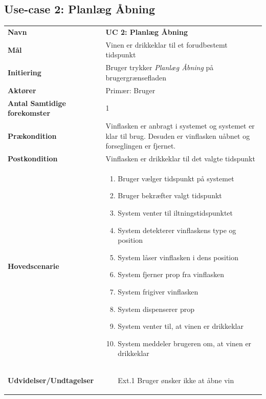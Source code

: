 \subsection{Use-case 2: Planlæg Åbning}
\begin{tabular}{>{\bfseries}p{100pt} p{300pt}}
	
	Navn & \bfseries{UC 2: Planlæg Åbning} \\
	Mål & Vinen er drikkeklar til et forudbestemt tidspunkt\\
	Initiering & Bruger trykker \emph{Planlæg Åbning} på brugergrænsefladen\\
	Aktører & Primær: Bruger \\
	Antal Samtidige forekomster & 1 \\
	Prækondition & Vinflasken er anbragt i systemet og systemet er klar til brug. Desuden er vinflasken uåbnet og forseglingen er fjernet. \\
	Postkondition & Vinflasken er drikkeklar til det valgte tidspunkt\\
	Hovedscenarie & \begin{enumerate}
		\item Bruger vælger tidspunkt på systemet
		\subitem [Ext. 1: Bruger ønsker ikke at åbne vin] 
		\item Bruger bekræfter valgt tidspunkt
		\subitem [Ext. 2: Vinen kan ikke iltes korrekt til det valgte tidspunkt]
		\item System venter til iltningstidspunktet
		\subitem [Ext. 3: System registrererugyldig type af vinflaske]
		\item System detekterer vinflaskens type og position
		\subitem [Ext. 4: System registrerer ugyldig type af vinflaske]
		\subitem [Ext. 5: System kan ikke registrere en vinflaske]
		\item System låser vinflasken i dens position
		\item System fjerner prop fra vinflasken
		\item System frigiver vinflasken
		\item System dispenserer prop
		\item System venter til, at vinen er drikkeklar
		\item System meddeler brugeren om, at vinen er drikkeklar		
	\end{enumerate} \\
	Udvidelser/Undtagelser & 
	\begin{enumerate}{}{}
		\item[Ext.1] Bruger ønsker ikke at åbne vin 
		

\end{enumerate}
\end{tabular}
